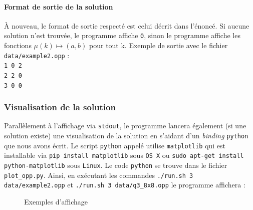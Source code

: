 \documentclass[a4paper]{article}
\begin{document}
\paragraph{Format de sortie de la solution}
À nouveau, le format de sortie respecté est celui décrit dans l'énoncé. Si aucune solution n'est trouvée, le programme affiche \texttt{0}, sinon le programme affiche les fonctions $\mu(k) \mapsto (a,b)$ pour tout k. Exemple de sortie avec le fichier \texttt{data/example2.opp} :
\texttt{\\1 0 2\\2 2 0 \\3 0 0}

\subsubsection{Visualisation de la solution}
Parallèlement à l'affichage via \texttt{stdout}, le programme lancera également (si une solution existe) une visualisation de la solution en s'aidant d'un \textit{binding} \texttt{python} que nous avons écrit. Le script \texttt{python} appelé utilise \texttt{matplotlib} qui est installable via \texttt{pip install matplotlib} sous \texttt{OS X} ou \texttt{sudo apt-get install python-matplotlib} sous \texttt{Linux}. Le code \texttt{python} se trouve dans le fichier \texttt{plot\_opp.py}. 
Ainsi, en exécutant les commandes \texttt{./run.sh 3 data/example2.opp} et \texttt{./run.sh 3 data/q3\_8x8.opp} le programme affichera : 

\begin{figure}[H]
  \centering
  \hfill
  \caption{Exemples d'affichage}
\end{figure}
\end{document}
